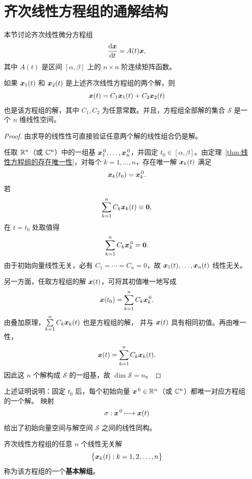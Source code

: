 \section{齐次线性方程组的通解结构}\label{sec:齐次线性方程组的通解结构}

本节讨论齐次线性微分方程组
\[
	\dfrac{\mathrm{d}\boldsymbol{x}}{\mathrm{d} t}=A(t)\boldsymbol{x},
\]
其中 $A(t)$ 是区间 $[\alpha,\beta]$ 上的 $n\times n$ 阶连续矩阵函数。

\begin{theorem}\label{thm:齐次线性方程组的解空间}
	如果 $\boldsymbol{x}_1(t)$ 和 $\boldsymbol{x}_2(t)$ 是上述齐次线性方程组的两个解，则
	\[
		\boldsymbol{x}(t)
		=C_1\boldsymbol{x}_1(t)+C_2\boldsymbol{x}_2(t)
	\]
	也是该方程组的解，其中 $C_1,C_2$ 为任意常数。并且，方程组全部解的集合
	$\mathcal{S}$ 是一个 $n$ 维线性空间。
\end{theorem}

\begin{proof}
	由求导的线性性可直接验证任意两个解的线性组合仍是解。

	任取 $\mathbb{R}^n$（或 $\mathbb{C}^n$）中的一组基
	$\boldsymbol{x}_1^{\,0},\ldots,\boldsymbol{x}_n^{\,0}$，并固定
	$t_0\in[\alpha,\beta]$。由定理~\ref{thm:线性方程组的存在唯一性}，对每个
	$k=1,\ldots,n$，存在唯一解 $\boldsymbol{x}_k(t)$ 满足
	\[
		\boldsymbol{x}_k(t_0)=\boldsymbol{x}_k^{\,0}.
	\]
	若
	\[
		\sum_{k=1}^{n}C_k\boldsymbol{x}_k(t)\equiv\boldsymbol{0},
	\]
	在 $t=t_0$ 处取值得
	\[
		\sum_{k=1}^{n}C_k\boldsymbol{x}_k^{\,0}=\boldsymbol{0}.
	\]
	由于初始向量线性无关，必有 $C_1=\cdots=C_n=0$，故
	$\boldsymbol{x}_1(t),\ldots,\boldsymbol{x}_n(t)$ 线性无关。

	另一方面，任取方程组的解 $\boldsymbol{x}(t)$，可将其初值唯一地写成
	\[
		\boldsymbol{x}(t_0)
		=\sum_{k=1}^{n}C_k\boldsymbol{x}_k^{\,0}.
	\]
	由叠加原理，$\sum\limits_{k=1}^{n}C_k\boldsymbol{x}_k(t)$ 也是方程组的解，
	并与 $\boldsymbol{x}(t)$ 具有相同初值。再由唯一性，
	\[
		\boldsymbol{x}(t)
		=\sum_{k=1}^{n}C_k\boldsymbol{x}_k(t).
	\]
	因此这 $n$ 个解构成 $\mathcal{S}$ 的一组基，故
	$\dim\mathcal{S}=n$。
\end{proof}

上述证明说明：固定 $t_0$ 后，每个初始向量
$\boldsymbol{x}^{\,0}\in\mathbb{R}^n$（或 $\mathbb{C}^n$）都唯一对应方程组的一个解。
映射
\[
	\sigma:\boldsymbol{x}^{\,0}\longmapsto\boldsymbol{x}(t)
\]
给出了初始向量空间与解空间 $\mathcal{S}$ 之间的线性同构。

\begin{definition}\label{def:基本解组}
	齐次线性方程组的任意 $n$ 个线性无关解
	\[
		\bigl\{\boldsymbol{x}_k(t):k=1,2,\ldots,n\bigr\}
	\]
	称为该方程组的一个\textbf{基本解组}。
\end{definition}

